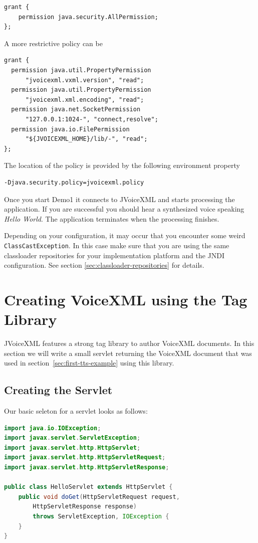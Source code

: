 \documentclass[11pt,a4paper]{book}
\begin{document}
\begin{lstlisting}
grant {
    permission java.security.AllPermission;
};
\end{lstlisting}

A more restrictive policy can be

\begin{lstlisting}
grant {
  permission java.util.PropertyPermission
      "jvoicexml.vxml.version", "read";
  permission java.util.PropertyPermission
      "jvoicexml.xml.encoding", "read";
  permission java.net.SocketPermission
      "127.0.0.1:1024-", "connect,resolve";
  permission java.io.FilePermission
      "${JVOICEXML_HOME}/lib/-", "read";
};
\end{lstlisting}

The location of the policy is provided by the following environment property

\begin{lstlisting}
-Djava.security.policy=jvoicexml.policy
\end{lstlisting}

Once you start Demo1 it connects to JVoiceXML and starts processing
the application. If you are successful you should hear a synthesized voice
speaking \emph{Hello World}. The application terminates when the processing
finishes.

Depending on your configuration, it may occur that you encounter some weird
\lstinline{ClassCastException}. In this case make sure that you are using the
same classloader repositories for your implementation platform and the
JNDI configuration. See section \ref{sec:classloader-repositories} for
details.

\section{Creating VoiceXML using the Tag Library}

JVoiceXML features a strong tag library to author VoiceXML documents. In
this section we will write a small servlet returning the VoiceXML document that
was used in section~\ref{sec:first-tts-example} using this library.

\subsection{Creating the Servlet}

Our basic seleton for a servlet looks as follows:

\begin{lstlisting}[language=Java]
import java.io.IOException;
import javax.servlet.ServletException;
import javax.servlet.http.HttpServlet;
import javax.servlet.http.HttpServletRequest;
import javax.servlet.http.HttpServletResponse;

public class HelloServlet extends HttpServlet {
    public void doGet(HttpServletRequest request,
        HttpServletResponse response)
        throws ServletException, IOException {
    }
}
\end{lstlisting}
\end{document}
